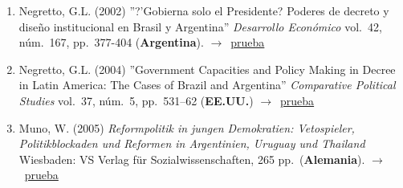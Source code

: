 \documentclass[12 pt, letter]{article}
\newenvironment{CitasMiTrabajo}{
    \begin{footnotesize}
    \begin{enumerate}[label={\footnotesize\emph{cita~\arabic*}},ref=\arabic*] %
        \setlength{\itemsep}{.1\itemsep}
        \setlength{\parskip}{.1\parskip}
    }{\end{enumerate}\end{footnotesize}}
\begin{document}
        \begin{CitasMiTrabajo}

        \item Negretto, G.L. (2002)
        ''?'Gobierna solo el Presidente? Poderes de decreto y dise\~no institucional en Brasil y Argentina'' \emph{Desarrollo Econ\'omico}
        vol.\ 42, n\'um.\ 167, pp.\ 377-404 (\textbf{Argentina}). $\rightarrow$~\href{https://github.com/emagar/cv/blob/master/citasMiTrab/decreeArg/negre2.pdf}{prueba}

        \item Negretto, G.L. (2004)
        ''Government Capacities and Policy Making in
        Decree in Latin America: The Cases of Brazil and Argentina''
        \emph{Comparative Political Studies} vol.\ 37, n\'um.\ 5, pp.\ 531--62 (\textbf{EE.UU.}) $\rightarrow$~\href{https://github.com/emagar/cv/blob/master/citasMiTrab/decreeArg/negre.pdf}{prueba}

        \item Muno, W. (2005)
        \emph{Reformpolitik in jungen Demokratien:
        Vetospieler, Politikblockaden und Reformen in Argentinien, Uruguay und
        Thailand} Wiesbaden: VS Verlag f\"ur Sozialwissenschaften, 265 pp.\ (\textbf{Alemania}). $\rightarrow$~\href{https://github.com/emagar/cv/blob/master/citasMiTrab/decreeArg/muno.pdf}{prueba}

        \label{ncites:magarArgDecrees2001} %

        \end{CitasMiTrabajo}





\end{document}
